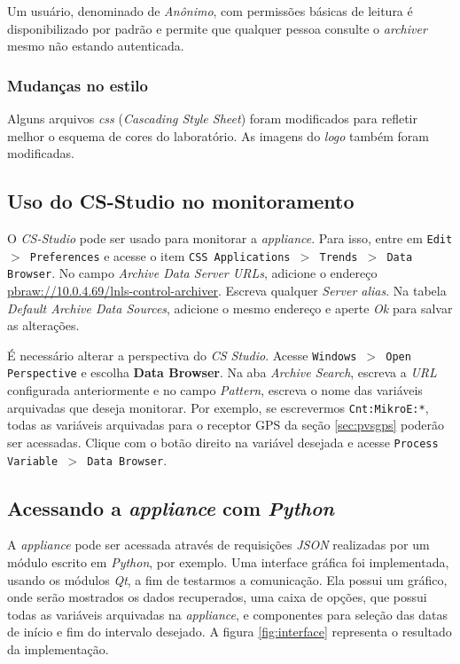 \vspace{12pt}

Um usuário, denominado de \textit{Anônimo}, com permissões básicas de leitura é
disponibilizado por padrão e permite que qualquer pessoa consulte o
\textit{archiver} mesmo não estando autenticada.

\subsubsection{Mudanças no estilo}

Alguns arquivos \textit{css} (\textit{Cascading Style Sheet}) foram modificados
para refletir melhor o esquema de cores do laboratório. As imagens do
\textit{logo} também foram modificadas.

\subsection{Uso do CS-Studio no monitoramento} \label{appliance-csstudio}

O \textit{CS-Studio} \cite{css} pode ser usado para monitorar a
\textit{appliance}. Para isso, entre em \texttt{Edit \(>\) Preferences} e acesse
o item \texttt{CSS Applications \(>\) Trends \(>\) Data Browser}. No campo
\textit{Archive Data Server URLs}, adicione o endereço
\url{pbraw://10.0.4.69/lnls-control-archiver}.
Escreva qualquer \textit{Server alias}. Na tabela \textit{Default Archive Data
Sources}, adicione o mesmo endereço e aperte \textit{Ok} para salvar as
alterações.

\vspace{12pt}

É necessário alterar a perspectiva do \textit{CS Studio}. Acesse
\texttt{Windows \(>\) Open Perspective} e escolha \textbf{Data Browser}. Na aba
\textit{Archive Search}, escreva a \textit{URL} configurada anteriormente e no
campo \textit{Pattern}, escreva o nome das variáveis arquivadas que deseja
monitorar. Por exemplo, se escrevermos \texttt{Cnt:MikroE:*}, todas as variáveis
arquivadas para o receptor GPS da seção \ref{sec:pvsgps} poderão ser acessadas.
Clique com o botão direito na variável desejada e acesse \texttt{Process Variable \(>\) Data Browser}.

\subsection{Acessando a \textit{appliance} com \textit{Python}}

A \textit{appliance} pode ser acessada através de requisições \textit{JSON}
realizadas por um módulo escrito em \textit{Python}, por exemplo. Uma interface
gráfica foi implementada, usando os módulos \textit{Qt}, a fim de testarmos a
comunicação. Ela possui um gráfico, onde serão mostrados os dados recuperados,
uma caixa de opções, que possui todas as variáveis arquivadas na
\textit{appliance}, e componentes para seleção das datas de início e fim do
intervalo desejado. A figura \ref{fig:interface} representa o resultado da
implementação.

